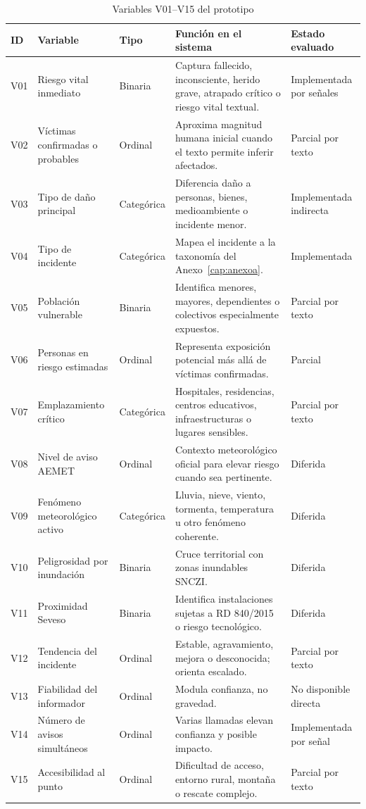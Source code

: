 \begin{table}[ht]
\centering
\caption{Variables V01--V15 del prototipo}
\label{tab:anexob-variables}
\scriptsize
\begin{tabularx}{\textwidth}{|p{1.0cm}|p{3.0cm}|p{2.1cm}|X|p{2.1cm}|}
\hline
\textbf{ID} & \textbf{Variable} & \textbf{Tipo} & \textbf{Función en el sistema} & \textbf{Estado evaluado} \\ \hline
V01 & Riesgo vital inmediato & Binaria & Captura fallecido, inconsciente, herido grave, atrapado crítico o riesgo vital textual. & Implementada por señales \\ \hline
V02 & Víctimas confirmadas o probables & Ordinal & Aproxima magnitud humana inicial cuando el texto permite inferir afectados. & Parcial por texto \\ \hline
V03 & Tipo de daño principal & Categórica & Diferencia daño a personas, bienes, medioambiente o incidente menor. & Implementada indirecta \\ \hline
V04 & Tipo de incidente & Categórica & Mapea el incidente a la taxonomía del Anexo~\ref{cap:anexoa}. & Implementada \\ \hline
V05 & Población vulnerable & Binaria & Identifica menores, mayores, dependientes o colectivos especialmente expuestos. & Parcial por texto \\ \hline
V06 & Personas en riesgo estimadas & Ordinal & Representa exposición potencial más allá de víctimas confirmadas. & Parcial \\ \hline
V07 & Emplazamiento crítico & Categórica & Hospitales, residencias, centros educativos, infraestructuras o lugares sensibles. & Parcial por texto \\ \hline
V08 & Nivel de aviso AEMET & Ordinal & Contexto meteorológico oficial para elevar riesgo cuando sea pertinente. & Diferida \\ \hline
V09 & Fenómeno meteorológico activo & Categórica & Lluvia, nieve, viento, tormenta, temperatura u otro fenómeno coherente. & Diferida \\ \hline
V10 & Peligrosidad por inundación & Binaria & Cruce territorial con zonas inundables SNCZI. & Diferida \\ \hline
V11 & Proximidad Seveso & Binaria & Identifica instalaciones sujetas a RD 840/2015 o riesgo tecnológico. & Diferida \\ \hline
V12 & Tendencia del incidente & Ordinal & Estable, agravamiento, mejora o desconocida; orienta escalado. & Parcial por texto \\ \hline
V13 & Fiabilidad del informador & Ordinal & Modula confianza, no gravedad. & No disponible directa \\ \hline
V14 & Número de avisos simultáneos & Ordinal & Varias llamadas elevan confianza y posible impacto. & Implementada por señal \\ \hline
V15 & Accesibilidad al punto & Ordinal & Dificultad de acceso, entorno rural, montaña o rescate complejo. & Parcial por texto \\ \hline
\end{tabularx}
\end{table}


